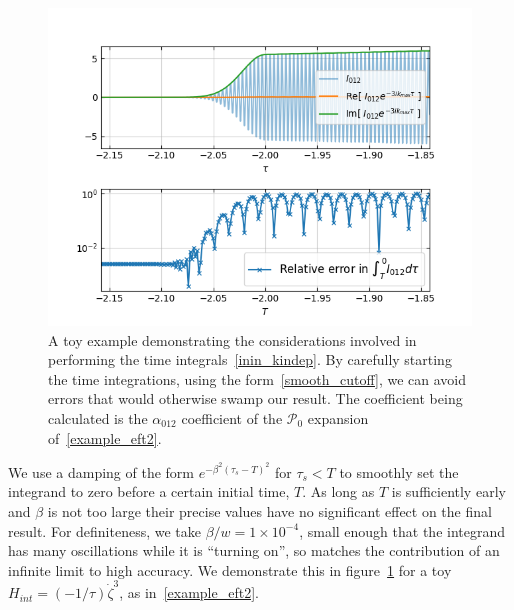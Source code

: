 \documentclass[a4paper,12pt]{extarticle}
\newcommand{\Hint}{H_{int}}
\newcommand{\Lbasic}{\mathcal{P}_0}
\begin{document}
\begin{figure}[!pth]
\centering
\includegraphics[width=\columnwidth]{plots/time_integrand.png}
\caption{
    A toy example demonstrating the considerations involved in performing the
    time integrals~\eqref{inin_kindep}.
    By carefully starting the time integrations,
    using the form~\eqref{smooth_cutoff}, we can avoid
    errors that would otherwise swamp our result.
    The coefficient being calculated is the
    $\alpha_{012}$ coefficient of the $\Lbasic$ expansion of~\eqref{example_eft2}.
}\label{time_integrands}
\end{figure}


We use a damping of the form $e^{-\beta^2(\tau_s-T)^2}$ for $\tau_s<T$ to smoothly
set the integrand to zero before a certain initial time, $T$.
As long as $T$ is sufficiently early and $\beta$ is not too large
their precise values have no significant effect on the final result.
For definiteness, we take $\beta/w=1\times10^{-4}$, small enough that
the integrand has many oscillations while it is ``turning on'',
so matches the contribution of an infinite limit to high accuracy.
We demonstrate this in figure~\ref{time_integrands}
for a toy $\Hint=(-1/\tau)\dot{\zeta}^3$,
as in~\eqref{example_eft2}.
\end{document}
